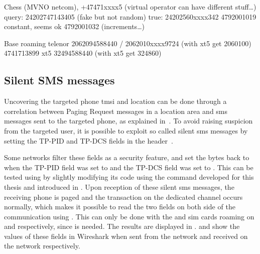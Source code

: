       Chess (MVNO netcom), +47471xxxx5 (virtual operator can have different stuff…)
      query: 24202747143405 (fake but not random) true: 24202560xxxx342
      4792001019 constant, seems ok
      4792001032 (increments…)

      Base roaming telenor
      2062094588440 / 2062010xxxx9724 (with xt5 get 2060100)
      4741713899 xt5
      32494588440 (with xt5 get 324860)
      \fi

    \subsection{Silent SMS messages}
    \label{sec:silent_sms}

      Uncovering the targeted phone \gls{tmsi} and location can be done
      through a correlation between Paging Request messages in a
      location area and \gls{sms} messages sent to the targeted phone,
      as explained in~. To avoid raising
      suspicion from the targeted user, it is possible to exploit so
      called silent \gls{sms} messages by setting the TP-PID and TP-DCS
      fields in the header~\cite[p.~53]{3gpp_ts_2001}.
      
      Some networks filter these fields as a security feature, and set
      the bytes back to  when the TP-PID field was set to
       and the TP-DCS field was set to . This can
      be tested using  by slightly modifying its code
      using the  command developed for this thesis and
      introduced in . Upon reception of these
      silent \gls{sms} messages, the receiving phone is paged and the
      transaction on the dedicated channel occurs normally, which makes
      it possible to read the two fields on both side of the
      communication using . This can only be done with
      the  and  \gls{sim} cards roaming on
       and  respectively, since
       is needed. The results are displayed in
      .  and
       show the values of these fields in
      Wireshark when sent from the  network and received on
      the  network respectively.

